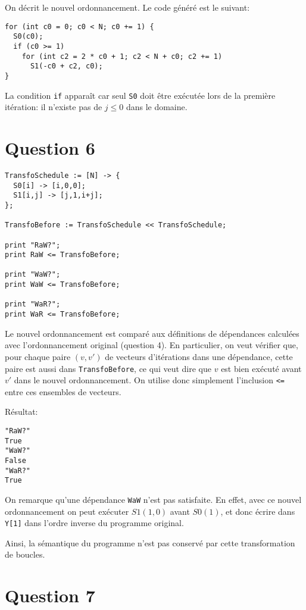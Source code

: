 \documentclass{article}
\begin{document}
On décrit le nouvel ordonnancement. Le code généré est le suivant:

\begin{lstlisting}
for (int c0 = 0; c0 < N; c0 += 1) {
  S0(c0);
  if (c0 >= 1)
    for (int c2 = 2 * c0 + 1; c2 < N + c0; c2 += 1)
      S1(-c0 + c2, c0);
}
\end{lstlisting}

La condition \lstinline{if} apparaît car seul \lstinline{S0} doit être exécutée lors de la première itération: il n'existe pas de $j\leq 0$ dans le domaine.

\section*{Question 6}
\begin{lstlisting}
TransfoSchedule := [N] -> {
  S0[i] -> [i,0,0];
  S1[i,j] -> [j,1,i+j];
};

TransfoBefore := TransfoSchedule << TransfoSchedule;

print "RaW?";
print RaW <= TransfoBefore;

print "WaW?";
print WaW <= TransfoBefore;

print "WaR?";
print WaR <= TransfoBefore;
\end{lstlisting}

Le nouvel ordonnancement est comparé aux définitions de dépendances calculées avec l'ordonnancement original (question 4).
En particulier, on veut vérifier que, pour chaque paire $(v,v')$ de vecteurs d'itérations dans une dépendance, cette paire est aussi dans \lstinline{TransfoBefore}, ce qui veut dire que $v$ est bien exécuté avant $v'$ dans le nouvel ordonnancement. On utilise donc simplement l'inclusion \lstinline{<=} entre ces ensembles de vecteurs.

Résultat:
\begin{lstlisting}
"RaW?"
True
"WaW?"
False
"WaR?"
True
\end{lstlisting}

On remarque qu'une dépendance \lstinline{WaW} n'est pas satisfaite.
En effet, avec ce nouvel ordonnancement on peut exécuter $S1(1,0)$ avant $S0(1)$, et donc écrire dans \lstinline{Y[1]} dans l'ordre inverse du programme original.

Ainsi, la sémantique du programme n'est pas conservé par cette transformation de boucles.

\section*{Question 7}
\end{document}
